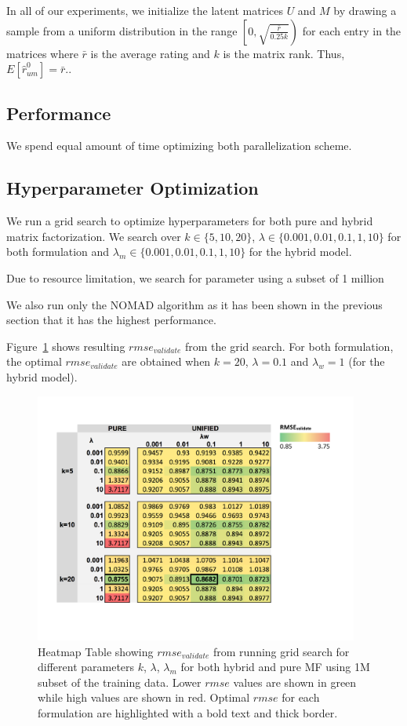 \documentclass{article} %
\begin{document}
In all of our experiments,  we initialize the latent matrices $U$ and $M$ by drawing a sample from a uniform distribution in the range $\left[0,\sqrt{\frac{\bar{r}}{0.25k}}\right)$ for each entry in the matrices where $\bar{r}$ is the average rating and $k$ is the matrix rank. Thus, $E[\hat{r}_{um}^0] = \bar{r}$..

\subsection{Performance}

We spend equal amount of time optimizing both parallelization scheme.

\subsection{Hyperparameter Optimization}

We run a grid search to optimize hyperparameters for both pure and hybrid
matrix factorization. We search over $k \in \{5, 10, 20\}$, $\lambda \in \{
0.001, 0.01, 0.1, 1, 10\}$ for both formulation and $\lambda_m \in \{
0.001, 0.01, 0.1, 1, 10\}$ for the hybrid model.

Due to resource limitation, we search for parameter using a subset of 1 million


We also run only the NOMAD algorithm as it
has been shown in the previous section that it has the highest performance.

Figure~\ref{fig:gridsearch} shows resulting $rmse_{validate}$ from the grid search.
For both formulation, the optimal $rmse_{validate}$ are obtained when
$k=20$, $\lambda=0.1$ and $\lambda_w=1$ (for the hybrid model).

\begin{figure}[h]
\centering
\includegraphics[width=4.2in]{figures/grid}
\caption{\label{fig:gridsearch} Heatmap Table showing $rmse_{validate}$ from
running grid search for different parameters $k$, $\lambda$, $\lambda_m$ for
both hybrid and pure MF using 1M subset of the training data.  Lower $rmse$
values are shown in green while high values are shown in red.  Optimal $rmse$
for each formulation are highlighted with a bold text and thick border.}
\end{figure}
\end{document}
